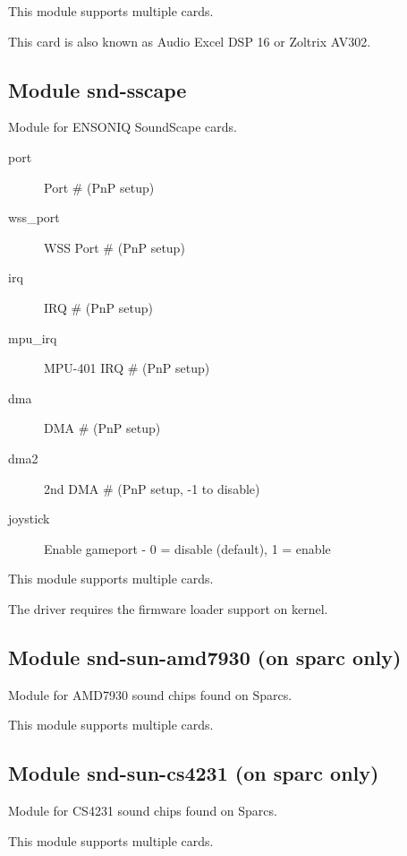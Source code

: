 \documentclass[a4paper,8pt,english]{sphinxmanual}
\begin{document}
This module supports multiple cards.

This card is also known as Audio Excel DSP 16 or Zoltrix AV302.


\subsection{Module snd-sscape}
\label{sound/alsa-configuration:module-snd-sscape}
Module for ENSONIQ SoundScape cards.
\begin{description}
\item[{port}] \leavevmode
Port \# (PnP setup)

\item[{wss\_port}] \leavevmode
WSS Port \# (PnP setup)

\item[{irq}] \leavevmode
IRQ \# (PnP setup)

\item[{mpu\_irq}] \leavevmode
MPU-401 IRQ \# (PnP setup)

\item[{dma}] \leavevmode
DMA \# (PnP setup)

\item[{dma2}] \leavevmode
2nd DMA \# (PnP setup, -1 to disable)

\item[{joystick}] \leavevmode
Enable gameport - 0 = disable (default), 1 = enable

\end{description}

This module supports multiple cards.

The driver requires the firmware loader support on kernel.


\subsection{Module snd-sun-amd7930 (on sparc only)}
\label{sound/alsa-configuration:module-snd-sun-amd7930-on-sparc-only}
Module for AMD7930 sound chips found on Sparcs.

This module supports multiple cards.


\subsection{Module snd-sun-cs4231 (on sparc only)}
\label{sound/alsa-configuration:module-snd-sun-cs4231-on-sparc-only}
Module for CS4231 sound chips found on Sparcs.

This module supports multiple cards.
\end{document}
